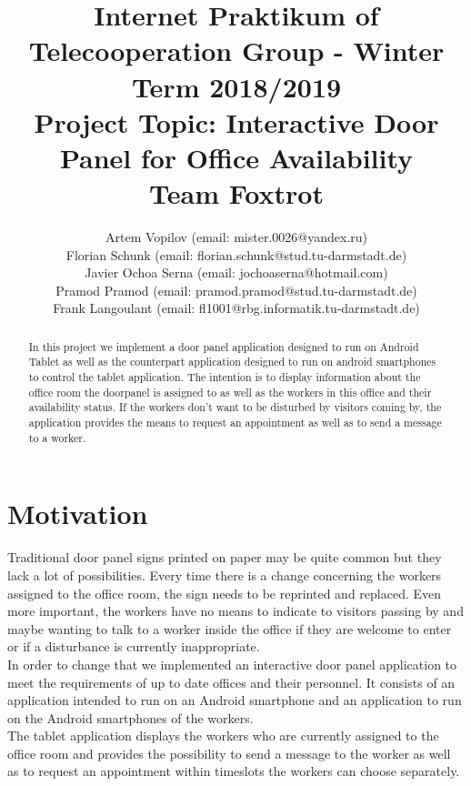 \documentclass[article,colorback,accentcolor=tud4c, 11pt]{tudreport}
\title{Internet Praktikum of Telecooperation Group - Winter Term 2018/2019\\
	Project Topic: Interactive Door Panel for Office Availability\\ Team Foxtrot}
\subtitle{Artem Vopilov (email: mister.0026@yandex.ru)\\Florian Schunk (email: florian.schunk@stud.tu-darmstadt.de)\\ Javier Ochoa Serna (email: jochoaserna@hotmail.com)\\
	Pramod Pramod (email: pramod.pramod@stud.tu-darmstadt.de) \\ Frank Langoulant (email: fl1001@rbg.informatik.tu-darmstadt.de)}
\begin{document}
	\maketitle
	\begin{abstract}
		In this project we implement a door panel application designed to run on  Android Tablet as well as the counterpart application designed to run on android smartphones to control the tablet application. The intention is to display information about the office room the doorpanel is assigned to as well as the workers in this office and their availability status. If the workers don't want to be disturbed by visitors coming by, the application provides the means to request an appointment as well as to send a message to a worker.
	\end{abstract}  
	
	\tableofcontents
	\newpage
	
	\section{Motivation}
	
Traditional door panel signs printed on paper may be quite common but they lack a lot of possibilities. Every time there is a change concerning the workers assigned to the office room, the sign needs to be reprinted and replaced. Even more important, the workers have no means to indicate to visitors passing by and maybe wanting to talk to a worker inside the office if they are welcome to enter or if a disturbance is currently inappropriate. \\

In order to change that we implemented an interactive door panel application to meet the requirements of up to date offices and their personnel. It consists of an application intended to run on an Android smartphone and an application to run on the Android smartphones of the workers. \\

The tablet application displays the workers who are currently assigned to the office room and provides the possibility to send a message to the worker as well as to request an appointment within timeslots the workers can choose separately. \\
\end{document}
